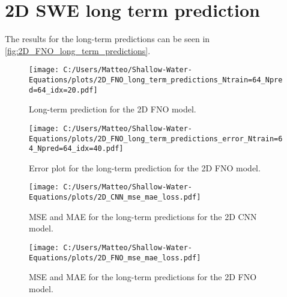 \section{2D SWE long term prediction}\label{app:2D_SWE_long_term_prediction}
The results for the long-term predictions can be seen in \autoref{fig:2D_FNO_long_term_predictions}.
\begin{figure}[H]
    \centering
    \texttt{[image: C:/Users/Matteo/Shallow-Water-Equations/plots/2D\_FNO\_long\_term\_predictions\_Ntrain=64\_Npred=64\_idx=20.pdf]}
    \caption{Long-term prediction for the 2D FNO model.}\label{fig:2D_FNO_long_term_predictions}
\end{figure}


\begin{figure}[H]
    \centering
    \texttt{[image: C:/Users/Matteo/Shallow-Water-Equations/plots/2D\_FNO\_long\_term\_predictions\_error\_Ntrain=64\_Npred=64\_idx=40.pdf]}
    \caption{Error plot for the long-term prediction for the 2D FNO model.}\label{fig:2D_FNO_long_term_error_40}
\end{figure}


\begin{figure}[H]
    \centering
    \texttt{[image: C:/Users/Matteo/Shallow-Water-Equations/plots/2D\_CNN\_mse\_mae\_loss.pdf]}
    \caption{MSE and MAE for the long-term predictions for the 2D CNN model.}\label{fig:2D_CNN_mse_mae_loss}
\end{figure}

\begin{figure}[H]
    \centering
    \texttt{[image: C:/Users/Matteo/Shallow-Water-Equations/plots/2D\_FNO\_mse\_mae\_loss.pdf]}
    \caption{MSE and MAE for the long-term predictions for the 2D FNO model.}\label{fig:2D_FNO_mse_mae_loss}
\end{figure}



